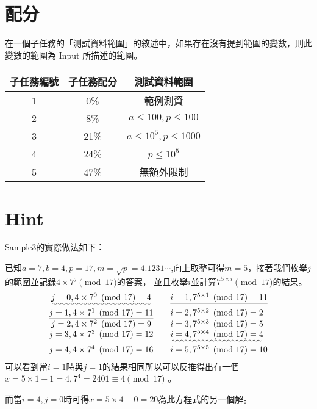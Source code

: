 \documentclass[11pt,a4paper]{article}
\begin{document}
\section*{配分}

在一個子任務的「測試資料範圍」的敘述中，如果存在沒有提到範圍的變數，則此變數的範圍為 Input 所描述的範圍。

\begin{center}
 \begin{tabular}{||c c c||} 
 \hline
 子任務編號 & 子任務配分 & 測試資料範圍 \\  
 \hline\hline
 1 & 0\% & 範例測資 \\ 
 \hline
 2 & 8\% & $a \le  100,p \le 100$ \\
 \hline
 3 & 21\% & $a \le  10^5,p \le 1000$ \\
 \hline
 4 & 24\% & $p \le 10^5$ \\
 \hline
 5 & 47\% & 無額外限制 \\
 \hline
\end{tabular}
\end{center}

\section*{Hint}

Sample3的實際做法如下：

已知$a = 7 ,b = 4 ,p = 17 , m =\sqrt p = 4.1231\cdots$,向上取整可得$m = 5$，接著我們枚舉$j$的範圍並記錄$4 \times 7^{j} \pmod{17}$的答案，
並且枚舉$i$並計算$7^ {5 \times i} \pmod {17}$的結果。
$$
\begin{array}{clcr}
	\uwave{j = 0 ,4 \times 7^{0} \pmod{17} = 4} \quad &  \underline{i = 1 ,7^{5 \times 1} \pmod{17} = 11}  \\
	\underline{j = 1 ,4 \times 7^{1} \pmod{17} = 11} \quad &  i = 2 ,7^{5 \times 2} \pmod{17} = 2 \\
	j = 2 ,4 \times 7^{2} \pmod{17} = 9 \quad &  i = 3 ,7^{5 \times 3} \pmod{17} = 5 \\
	j = 3 ,4 \times 7^{3} \pmod{17} = 12 \quad & \uwave{i = 4 ,7^{5 \times 4} \pmod{17} = 4 } \\
	j = 4 ,4 \times 7^{4} \pmod{17} = 16 \quad &  i = 5 ,7^{5 \times 5} \pmod{17} = 10 \\
\end{array}
$$
可以看到當$i = 1$時與$j = 1$的結果相同所以可以反推得出有一個$x = 5 \times 1 - 1 = 4 , 7^ {4} = 2401 \equiv 4 \pmod {17}$ 。

而當$i = 4, j = 0$時可得$x = 5 \times 4 - 0 = 20$為此方程式的另一個解。
\end{document}
